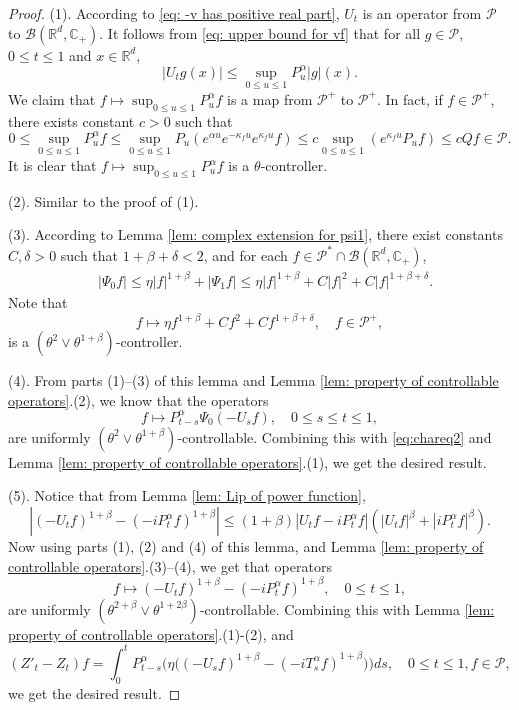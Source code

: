 \documentclass[12pt,a4paper]{amsart}
\theoremstyle{plain}
\theoremstyle{definition}
\numberwithin{equation}{section}
\begin{document}
\begin{proof}
    (1). According to \eqref{eq: -v has positive real part}, $U_t$ is an operator from $\mathcal P$ to $\mathcal B(\mathbb R^d, \mathbb C_+)$.
    It follows from \eqref{eq: upper bound for vf} that for all $g\in \mathcal P$, $0\leq t\leq 1$ and $x\in \mathbb R^d$,
\[
    |U_t g(x)|
    \leq \sup_{0\leq u\leq 1}P_u^\alpha |g| (x).
\]
  We claim that $f\mapsto\sup_{0\leq u\leq 1}P^{\alpha}_u f$ is a map from $\mathcal P^+$ to $\mathcal P^+$. In fact, if $f\in \mathcal P^+$, there exists constant $c>0$ such that
\[
	0
	\leq \sup_{0\leq u\leq 1}P^{\alpha}_u f
	\leq \sup_{0\leq u\leq 1} P_u (e^{\alpha u} e^{-\kappa_f u} e^{\kappa_f u} f )
	\leq c \sup_{0\leq u\leq 1} (e^{\kappa_fu}P_u f) \leq c Qf \in \mathcal P.
\]
	It is clear that $f\mapsto\sup_{0\leq u\leq 1}P^{\alpha}_u f$ is a $\theta$-controller.


    (2). Similar to the proof of (1).

    (3).
        According to Lemma \ref{lem: complex extension for psi1},
         there exist constants $C, \delta >0$ such that  $1+\beta+\delta< 2$, and for each $f\in \mathcal P^* \cap \mathcal B(\mathbb R^d, \mathbb C_+)$,
\begin{align}
    &|\Psi_0 f|
    \leq \eta |f|^{1+\beta} + |\Psi_1 f|
    \leq \eta |f|^{1+\beta} + C|f|^2+ C |f|^{1+\beta + \delta}.
\end{align}
    Note that
\[
    f \mapsto \eta f^{1+\beta} + Cf^2+ Cf^{1+\beta + \delta},\quad f\in \mathcal P^+,
\]
    is a $(\theta^2 \vee \theta^{1+\beta})$-controller.

    (4). From parts (1)--(3) of this lemma and Lemma \ref{lem: property of controllable operators}.(2), we know that the operators
\[
    f\mapsto P^\alpha_{t-s}\Psi_0(-U_sf),
    \quad 0\leq s\leq t\leq 1,
\]
    are uniformly $(\theta^2\vee \theta^{1+\beta})$-controllable.
    Combining this with \eqref{eq:chareq2} and Lemma \ref{lem: property of controllable operators}.(1), we get the desired result.

    (5). Notice that from Lemma \ref{lem: Lip of power function},
\[
    |(-U_t f)^{1+\beta} - (-iP^\alpha_t f)^{1+\beta} |
    \leq  (1+\beta) |U_t f-iP^\alpha_t f|(|U_t f|^{\beta}+|i P^\alpha_t f|^{\beta}).
\]
    Now using parts (1), (2) and  (4) of this lemma, and Lemma \ref{lem: property of controllable operators}.(3)--(4), we get that operators
\[
    f \mapsto (-U_t f)^{1+\beta} - (-iP^\alpha_t f)^{1+\beta},\quad 0\leq t\leq 1,
\]
    are uniformly $(\theta^{2+\beta}\vee \theta^{1+2\beta})$-controllable.
    Combining this with Lemma \ref{lem: property of controllable operators}.(1)-(2), and
\begin{equation}
    (Z'_t - Z_t)f = \int_0^t P^\alpha_{t-s}\Big( \eta \big((-U_s f)^{1+\beta} - (-iT_s^\alpha f)^{1+\beta} \big)\Big)ds,
    \quad 0\leq t\leq 1, f\in \mathcal P,
\end{equation}
    we get the desired result.


\end{proof}
\end{document}
